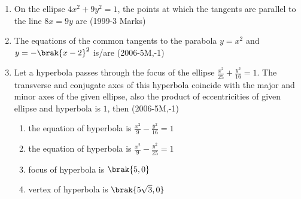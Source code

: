 \begin{enumerate}
\item On the ellipse $4x^2+9y^2=1$, the points at which the tangents are parallel to the line $8x=9y$ are \hfill(1999-3 Marks)\\
	\begin{enumerate}
	\end{enumerate}

\item The equations of the common tangents to the parabola $y=x^2$ and $y=-\brak{x-2}^2$ is/are \hfill(2006-5M,-1)\\
	\begin{enumerate}
			\begin{multicols}{2}
		\item $y=4\brak{x-1}$
		\item $y=0$
			\columnbreak
		\item $y=-4\brak{x-1}$
		\item $y=-30x-50$
			\end{multicols}
	\end{enumerate}

\item Let a hyperbola passes through the focus of the ellipse $\frac{x^2}{25}+\frac{y^2}{16}=1$. The transverse and conjugate axes of this hyperbola coincide with the major and minor axes of the given ellipse, also the product of eccentricities of given ellipse and hyperbola is $1$, then \hfill (2006-5M,-1)\\
	\begin{enumerate}
		\item the equation of hyperbola is $\frac{x^2}{9}-\frac{y^2}{16}=1$
		\item the equation of hyperbola is $\frac{x^2}{9}-\frac{y^2}{25}=1$
		\item focus of hyperbola is $\brak{5,0}$
		\item vertex of hyperbola is $\brak{5\sqrt{3},0}$
	\end{enumerate}


\end{enumerate}
